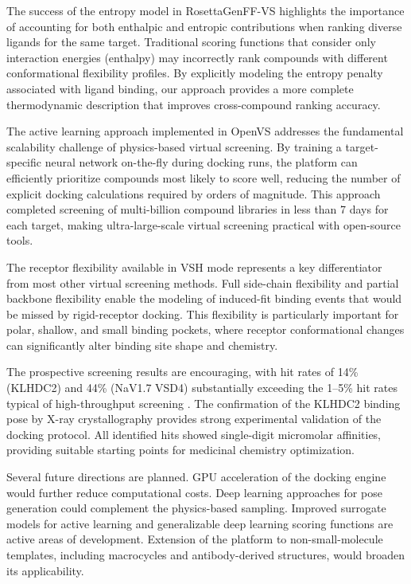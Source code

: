 \documentclass[12pt]{article}
\begin{document}
The success of the entropy model in RosettaGenFF-VS highlights the importance of accounting for both enthalpic and entropic contributions when ranking diverse ligands for the same target. Traditional scoring functions that consider only interaction energies (enthalpy) may incorrectly rank compounds with different conformational flexibility profiles. By explicitly modeling the entropy penalty associated with ligand binding, our approach provides a more complete thermodynamic description that improves cross-compound ranking accuracy.

The active learning approach implemented in OpenVS addresses the fundamental scalability challenge of physics-based virtual screening. By training a target-specific neural network on-the-fly during docking runs, the platform can efficiently prioritize compounds most likely to score well, reducing the number of explicit docking calculations required by orders of magnitude. This approach completed screening of multi-billion compound libraries in less than 7 days for each target, making ultra-large-scale virtual screening practical with open-source tools.

The receptor flexibility available in VSH mode represents a key differentiator from most other virtual screening methods. Full side-chain flexibility and partial backbone flexibility enable the modeling of induced-fit binding events that would be missed by rigid-receptor docking. This flexibility is particularly important for polar, shallow, and small binding pockets, where receptor conformational changes can significantly alter binding site shape and chemistry.

The prospective screening results are encouraging, with hit rates of 14\% (KLHDC2) and 44\% (NaV1.7 VSD4) substantially exceeding the 1--5\% hit rates typical of high-throughput screening \citep{macarron2011}. The confirmation of the KLHDC2 binding pose by X-ray crystallography provides strong experimental validation of the docking protocol. All identified hits showed single-digit micromolar affinities, providing suitable starting points for medicinal chemistry optimization.

Several future directions are planned. GPU acceleration of the docking engine would further reduce computational costs. Deep learning approaches for pose generation could complement the physics-based sampling. Improved surrogate models for active learning and generalizable deep learning scoring functions are active areas of development. Extension of the platform to non-small-molecule templates, including macrocycles and antibody-derived structures, would broaden its applicability.
\end{document}
